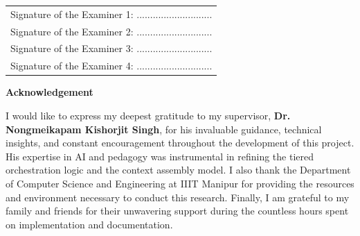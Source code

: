 \documentclass[a4paper, 11pt, oneside]{report}
\begin{document}
        \begin{flushleft}
            \begin{tabular}{l}
                Signature of the Examiner 1: ............................ \\[0.5cm]
                Signature of the Examiner 2: ............................ \\[0.5cm]
                Signature of the Examiner 3: ............................ \\[0.5cm]
                Signature of the Examiner 4: ............................
            \end{tabular}
        \end{flushleft}
        \newpage
 

\begin{abstract}
	With the proliferation of Large Language Models (LLMs) in educational technology, the challenges of operational cost, latency, and contextual relevance have become critical barriers to scaling personalized mentorship. This project introduces \textbf{Origin AI}, a context-aware, multimodal AI mentor designed for high-stakes competitive examination preparation. Origin AI implements a novel \textbf{4-Layer Context Assembly} model that integrates student history, real-time UI state, visual highlights, and multimodal queries to provide in-situ assistance without manual context description. To address financial sustainability, we propose a \textbf{Tiered Orchestration Pipeline} that prioritizes zero-cost local assets (stored solutions and subject-specific knowledge bases) before escalating to synthetic LLM generation. Experimental results demonstrate an 85\% reduction in token consumption and a 73\% reduction in median latency, while achieving 96\% subject resolution accuracy via a scoring-based \textbf{Cross-Subject Gate}. The system also incorporates pedagogical guardrails to enforce academic integrity and hint-first mentorship, ensuring that the AI functions as a teacher rather than a solution-providing proxy.
\end{abstract}

\pagebreak
	

        \begin{center}
            { \LARGE \textbf{Acknowledgement}}
        \end{center}
	I would like to express my deepest gratitude to my supervisor, \newline
    \textbf{Dr. Nongmeikapam Kishorjit Singh}, for his invaluable guidance, technical insights, and constant encouragement throughout the development of this project. His expertise in AI and pedagogy was instrumental in refining the tiered orchestration logic and the context assembly model. I also thank the Department of Computer Science and Engineering at IIIT Manipur for providing the resources and environment necessary to conduct this research. Finally, I am grateful to my family and friends for their unwavering support during the countless hours spent on implementation and documentation.
	
\end{document}
